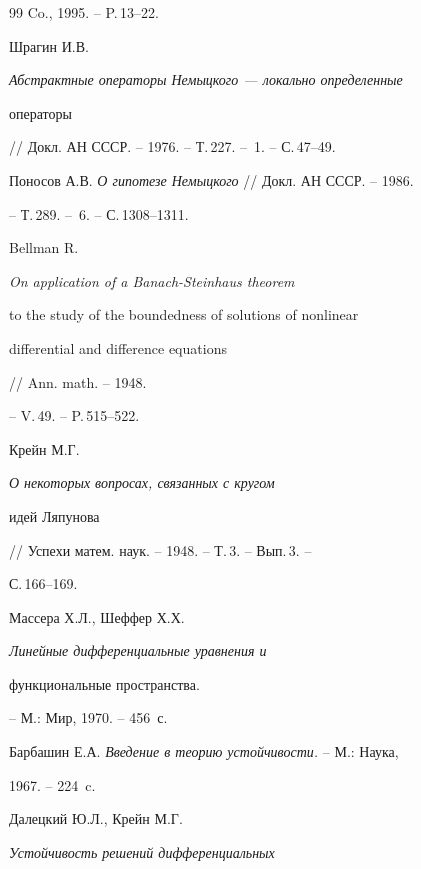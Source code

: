 \begin{thebibliography}{99}
Co., 1995. -- P.\,13--22.







Шрагин И.В. {\em Абстрактные операторы Немыцкого --- локально определенные


операторы} // Докл. АН СССР. -- 1976. -- Т.\,227. -- \No\,1. -- С.\,47--49.







Поносов А.В. {\em О гипотезе Немыцкого} // Докл. АН СССР. -- 1986.


-- Т.\,289. -- \No\,6. -- С.\,1308--1311.







Bellman R. {\em On application of a Banach-Steinhaus theorem


to the study of the boundedness of solutions of nonlinear


differential and difference equations} // Ann. math. -- 1948.


-- V.\,49. -- P.\,515--522.







Крейн М.Г. {\em О некоторых вопросах, связанных с кругом


идей Ляпунова} // Успехи матем. наук. -- 1948. -- Т.\,3. -- Вып.\,3. --


С.\,166--169.







Массера Х.Л., Шеффер Х.Х. {\em Линейные дифференциальные уравнения и


функциональные пространства.} -- М.: Мир, 1970. -- 456~с.










Барбашин Е.А. {\em Введение в теорию устойчивости.} -- М.: Наука,


1967. -- 224~c.







Далецкий Ю.Л., Крейн М.Г. {\em Устойчивость решений дифференциальных


}
\end{thebibliography}
